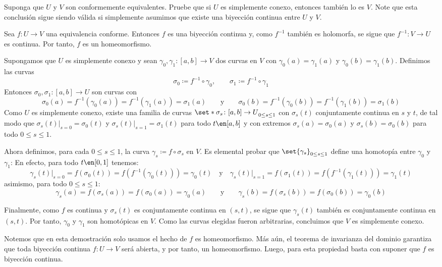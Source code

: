 \setcounter{eje}{2}
\begin{ejer}
Suponga que $U$ y $V$ son conformemente equivalentes. Pruebe que si $U$ es simplemente conexo, entonces también lo es $V$. Note que esta conclusión sigue siendo válida si simplemente asumimos que existe una biyección continua entre $U$ y $V$.
\end{ejer}
\begin{sol}
Sea $f:U\to V$ una equivalencia conforme. Entonces $f$ es una
biyección continua y, como $f^{-1}$ también es holomorfa, se sigue que
$f^{-1}
\colon V\to U$ es continua. Por tanto, $f$ es un homeomorfismo.

Supongamos que $U$ es simplemente conexo y sean $\gamma_0,\gamma_1 \colon [a,b] \to V$ dos curvas en $V$ con $\gamma_0(a) = \gamma_1(a)$ y $\gamma_0(b)=\gamma_1(b)$.
Definimos las curvas
\[
\sigma_0\coloneq f^{-1}\circ\gamma_0,
\qquad
\sigma_1\coloneq f^{-1}\circ\gamma_1
\]
Entonces $\sigma_0,\sigma_1 \colon [a,b] \to U$ son curvas con
\[
\sigma_0(a)
=
f^{-1}(\gamma_0(a))
=
f^{-1}(\gamma_1(a))
= \sigma_1(a)
\qquad\text{y}\qquad
\sigma_0(b)
=
f^{-1}(\gamma_0(b))
=
f^{-1}(\gamma_1(b))
= \sigma_1(b)
\]
Como $U$ es simplemente conexo, existe una familia de curvas
$\set*{\sigma_s\colon[a,b]\to U}_{0\le s\le1}$ con $\sigma_s(t)$ conjuntamente continua en $s$ y $t$, de tal modo que $\sigma_s(t)\big|_{s=0}=\sigma_0(t)$ y $\sigma_s(t)\big|_{s=1}=\sigma_1(t)$ para todo $t\en[a,b]$ y con extremos $\sigma_s(a) = \sigma_0(a)$ y $\sigma_s(b) = \sigma_0(b)$ para todo $0\le s \le 1$.

Ahora definimos, para cada $0\le s\le1$, la curva $\gamma_s \coloneq f\circ\sigma_s$ en $V$.
Es elemental probar que $\set{\gamma_s}_{0\le s\le1}$ define una homotopía entre
$\gamma_0$ y $\gamma_1$:
En efecto, para todo $t\en[0,1]$ tenemos:
\[
\gamma_s(t)\big|_{s=0}
=
f(\sigma_0(t))
=
f(f^{-1}(\gamma_0(t)))
=
\gamma_0(t)
\quad\text{y}\quad
\gamma_s(t)\big|_{s=1}
=
f(\sigma_1(t))
=
f(f^{-1}(\gamma_1(t)))
=
\gamma_1(t)
\]
asimismo, para todo $0\le s \le 1$:
\[
\gamma_s(a)=f(\sigma_s(a)) = f(\sigma_0(a))=\gamma_0(a)
\qquad\text{y}\qquad
\gamma_s(b)=f(\sigma_s(b)) = f(\sigma_0(b))=\gamma_0(b)
\]

Finalmente, como $f$ es continua y $\sigma_s(t)$ es conjuntamente
continua en $(s,t)$, se sigue que $\gamma_s(t)$ también es
conjuntamente continua en $(s,t)$.
Por tanto, $\gamma_0$ y $\gamma_1$ son homotópicas en $V$.
Como las curvas elegidas fueron arbitrarias, concluimos que $V$
es simplemente conexo.

Notemos que en esta demostración solo usamos el hecho de $f$ es homeomorfismo. Más aún, el teorema de invarianza del dominio garantiza que toda biyección continua $f \colon U \to V$ será abierta, y por tanto, un homeomorfismo. Luego, para esta propiedad basta con suponer que $f$ es biyección continua.
\end{sol}
